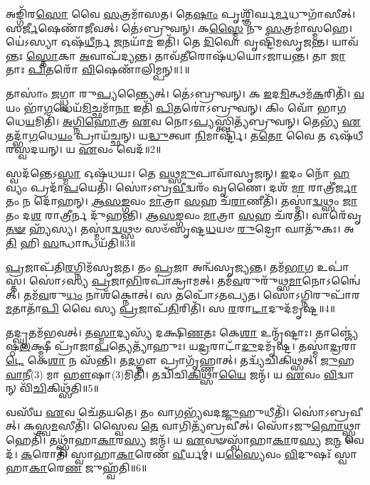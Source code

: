 𑌅𑌙𑍍𑌗𑌿᳴𑌰\-\ul{𑌸𑍋} 𑌵𑍈 \ul{𑌸}\-𑌤𑍍𑌰𑌮𑌾᳴𑌸𑌤।
𑌤𑍇\-\ul{𑌷𑌾𑌂} 𑌪𑍃𑌶𑍍𑌞𑌿᳴𑌰𑍍𑌘\-\ul{𑌰𑍍𑌮}\-𑌧𑍁𑌗𑌾᳴𑌸𑍀𑌤𑍍।
𑌸\-\ul{𑌰𑍍𑌜𑍀}\-𑌷𑍇𑌣𑌾᳴𑌜𑍀𑌵𑌤𑍍।
𑌤𑍇॑𑌽𑌬𑍍𑌰𑍁𑌵𑌨𑍍।
𑌕\-\ul{𑌸𑍍𑌮𑍈} 𑌨𑍁 \ul{𑌸}\-𑌤𑍍𑌰𑌮𑌾॑𑌸𑍍𑌮𑌹𑍇।
𑌯𑍇॑𑌽𑌸𑍍𑌯𑌾 𑌓𑌷᳴\-\ul{𑌧𑍀}\-𑌰𑍍𑌨 \ul{𑌜}\-𑌨𑌯𑌾᳴\-\ul{𑌮} 𑌇𑌤𑌿᳴।
𑌤𑍇 \ul{𑌦𑌿}\-𑌵𑍋 𑌵𑍃𑌷𑍍𑌟𑌿᳴𑌮𑌸𑍃𑌜𑌨𑍍𑌤।
𑌯𑌾𑌵᳴𑌨𑍍𑌤𑌃 \ul{𑌸𑍍𑌤𑍋}\-𑌕𑌾 \ul{𑌅}\-𑌵𑌾𑌪᳴𑌦𑍍𑌯𑌨𑍍𑌤।
𑌤𑌾𑌵᳴\-\ul{𑌤𑍀}\-𑌰𑍋𑌷᳴𑌧𑌯𑍋\-𑌽𑌜𑌾𑌯𑌨𑍍𑌤।
𑌤𑌾 \ul{𑌜𑌾}\-𑌤𑌾𑌃 \ul{𑌪𑌿}\-𑌤𑌰𑍋᳴ \ul{𑌵𑌿}\-𑌷𑍇𑌣𑌾᳴𑌲𑌿𑌮𑍍𑌪𑌨𑍍॥1॥

𑌤𑌾𑌸𑌾𑌂॑ \ul{𑌜}\-𑌗𑍍𑌧𑍍𑌵𑌾 𑌰𑍁\-\ul{𑌪𑍍𑌯}\-𑌨𑍍𑌤𑍍𑌯𑍈𑌤𑍍।
𑌤𑍇॑𑌽𑌬𑍍𑌰𑍁𑌵𑌨𑍍।
𑌕 \ul{𑌇}\-𑌦\-\ul{𑌮𑌿}\-𑌤𑍍𑌥𑌮᳴\-\ul{𑌕}\-𑌰𑌿𑌤𑌿᳴।
\-\ul{𑌵}\-𑌯𑌂 𑌭𑌾᳴\-\ul{𑌗}\-𑌧𑍇𑌯᳴\-\ul{𑌮𑌿}\-𑌚𑍍𑌛𑌮𑌾᳴\-\ul{𑌨𑌾} 𑌇𑌤𑌿᳴ \ul{𑌪𑌿}\-𑌤𑌰𑍋॑\-𑌽𑌬𑍍𑌰𑍁𑌵𑌨𑍍।
𑌕𑌿𑌂 𑌵𑍋᳴ 𑌭𑌾\-\ul{𑌗}\-𑌧𑍇\-\ul{𑌯}\-𑌮𑌿𑌤𑌿᳴।
\-\ul{𑌅}\-\-\ul{𑌗𑍍𑌨𑌿}\-\-\ul{𑌹𑍋}\-𑌤𑍍𑌰 \ul{𑌏}\-𑌵 𑌨𑍋𑌽\-\ul{𑌪𑍍𑌯}\-𑌸𑍍𑌤𑍍𑌵𑌿𑌤𑍍𑌯᳴𑌬𑍍𑌰𑍁𑌵𑌨𑍍।
𑌤𑍇𑌭𑍍𑌯᳴ \ul{𑌏}\-𑌤𑌦𑍍𑌭𑌾᳴\-\ul{𑌗}\-𑌧𑍇\-\ul{𑌯𑌂} 𑌪𑍍𑌰𑌾𑌯᳴𑌚𑍍𑌛𑌨𑍍।
𑌯\-\ul{𑌦𑍍𑌧𑍁}\-𑌤𑍍𑌵𑌾 \ul{𑌨𑌿}\-𑌮𑌾𑌰𑍍𑌷𑍍𑌟𑌿᳴।
𑌤\-\ul{𑌤𑍋} 𑌵𑍈 𑌤 𑌓𑌷᳴𑌧𑍀𑌰𑌸𑍍𑌵𑌦𑌯𑌨𑍍।
𑌯 \ul{𑌏}\-𑌵𑌂 𑌵𑍇𑌦᳴॥2॥

𑌸𑍍𑌵𑌦᳴𑌨𑍍𑌤𑍇\-𑌽\-\ul{𑌸𑍍𑌮𑌾} 𑌓𑌷᳴𑌧𑌯𑌃।
𑌤𑍇 \ul{𑌵}\-𑌥𑍍𑌸\-\ul{𑌮𑍁}\-𑌪𑌾𑌵𑌾᳴𑌸𑍃𑌜𑌨𑍍।
\-\ul{𑌇}\-𑌦𑌂 𑌨𑍋᳴ \ul{𑌹}\-𑌵𑍍𑌯𑌂 𑌪𑍍𑌰𑌦𑌾᳴\-\ul{𑌪}\-𑌯𑍇𑌤𑌿᳴।
𑌸𑍋॑𑌽𑌬𑍍𑌰\-\ul{𑌵𑍀}\-𑌦𑍍𑌵𑌰𑌂᳴ 𑌵𑍃𑌣𑍈।
𑌦𑌶᳴ \ul{𑌮𑌾} 𑌰𑌾𑌤𑍍𑌰𑍀॑\-\ul{𑌰𑍍𑌜𑌾}\-𑌤𑌂 𑌨 𑌦𑍋᳴𑌹𑌨𑍍।
\-\ul{𑌆}\-\-\ul{𑌸}\-\-\ul{𑌙𑍍𑌗}\-𑌵𑌂 \ul{𑌮𑌾}\-𑌤𑍍𑌰𑌾 \ul{𑌸}\-𑌹 𑌚᳴\-\ul{𑌰𑌾}\-𑌣𑍀𑌤𑌿᳴।
𑌤𑌸𑍍𑌮𑌾॑\-\ul{𑌦𑍍𑌵}\-𑌥𑍍𑌸𑌂 \ul{𑌜𑌾}\-𑌤𑌂 𑌦\-\ul{𑌶} 𑌰𑌾\-\ul{𑌤𑍍𑌰𑍀}\-𑌰𑍍𑌨 𑌦𑍁᳴𑌹𑌨𑍍𑌤𑌿।
\-\ul{𑌆}\-\-\ul{𑌸}\-\-\ul{𑌙𑍍𑌗}\-𑌵𑌂 \ul{𑌮𑌾}\-𑌤𑍍𑌰𑌾 \ul{𑌸}\-𑌹 𑌚᳴𑌰𑌤𑌿।
𑌵𑌾𑌰𑍇᳴𑌵𑍃\-\ul{𑌤}\-\-\ul{𑍟} 𑌹𑍍𑌯᳴𑌸𑍍𑌯।
𑌤𑌸𑍍𑌮𑌾॑\-\ul{𑌦𑍍𑌵}\-𑌥𑍍𑌸𑍞 𑌸𑍞᳴𑌸𑍃𑌷𑍍𑌟\-\ul{𑌧}\-𑌯𑍞 \ul{𑌰𑍁}\-𑌦𑍍𑌰𑍋 𑌘𑌾𑌤𑍁᳴𑌕𑌃।
𑌅\-\ul{𑌤𑌿} 𑌹𑌿 \ul{𑌸}\-𑌨𑍍𑌧𑌾𑌨𑍍𑌧𑌯᳴𑌤𑌿॥3॥\anuvakamend[\-\ul{𑌅}\-\-\ul{𑌲𑌿}\-\-\ul{𑌮𑍍𑌪}\-𑌨𑍍𑌵𑍇\-\ul{𑌦} 𑌘𑌾𑌤𑍁᳴\-\ul{𑌕} 𑌏𑌕𑌂᳴ 𑌚]

\-\ul{𑌪𑍍𑌰}\-𑌜𑌾𑌪᳴𑌤𑌿\-\ul{𑌰}\-𑌗𑍍𑌨𑌿𑌮᳴\-𑌸𑍃𑌜𑌤।
𑌤𑌂 \ul{𑌪𑍍𑌰}\-𑌜𑌾 𑌅𑌨𑍍𑌵᳴𑌸𑍃𑌜𑍍𑌯𑌨𑍍𑌤।
𑌤𑌮᳴\-\ul{𑌭𑌾}\-𑌗 𑌉𑌪𑌾॑𑌸𑍍𑌤।
𑌸𑍋॑𑌽𑌸𑍍𑌯 \ul{𑌪𑍍𑌰}\-𑌜𑌾\-\ul{𑌭𑌿}\-𑌰𑌪𑌾॑𑌕𑍍𑌰𑌾𑌮𑌤𑍍।
𑌤𑌮᳴\-\ul{𑌵}\-𑌰𑍁𑌰𑍁᳴𑌥𑍍𑌸\-\ul{𑌮𑌾}\-𑌨𑍋\-𑌽𑌨𑍍𑌵𑍈॑𑌤𑍍।
𑌤𑌮᳴\-\ul{𑌵}\-𑌰𑍁\-\ul{𑌧𑌂} 𑌨𑌾𑌶᳴𑌕𑍍𑌨𑍋𑌤𑍍।
𑌸 𑌤𑌪𑍋᳴\-𑌽𑌤𑌪𑍍𑌯𑌤।
𑌸𑍋॑𑌽𑌗𑍍𑌨𑌿𑌰𑍁𑌪𑌾᳴𑌰\-\ul{𑌮}\-𑌤𑌾𑌤𑌾᳴\-\ul{𑌪𑌿} 𑌵𑍈 𑌸𑍍𑌯 \ul{𑌪𑍍𑌰}\-𑌜𑌾𑌪᳴\-\ul{𑌤𑌿}\-𑌰𑌿𑌤𑌿᳴।
𑌸 \ul{𑌰}\-𑌰𑌾\-\ul{𑌟𑌾}\-𑌦𑍁𑌦᳴𑌮𑍃𑌷𑍍𑌟॥4॥

𑌤𑌦𑍍\mbox{}\-\ul{𑌘𑍃}\-𑌤𑌮᳴𑌭𑌵𑌤𑍍।
𑌤\-\ul{𑌸𑍍𑌮𑌾}\-𑌦𑍍𑌯𑌸𑍍𑌯᳴ 𑌦𑌕𑍍𑌷𑌿\-\ul{𑌣}\-𑌤𑌃 𑌕𑍇\-\ul{𑌶𑌾} 𑌉𑌨𑍍𑌮𑍃᳴𑌷𑍍𑌟𑌾𑌃।
𑌤𑌾𑌞𑍍𑌜𑍍𑌯𑍇॑𑌷𑍍𑌠\-\ul{𑌲}\-𑌕𑍍𑌷𑍍𑌮𑍀 𑌪𑍍𑌰𑌾᳴𑌜𑌾\-\ul{𑌪}\-𑌤𑍍𑌯𑍇𑌤𑍍𑌯𑌾᳴𑌹𑍁𑌃।
𑌯\-\ul{𑌦𑍍𑌰}\-𑌰𑌾𑌟𑌾᳴\-\ul{𑌦𑍁}\-𑌦𑌮𑍃᳴𑌷𑍍𑌟।
𑌤𑌸𑍍𑌮𑌾॑\-\ul{𑌦𑍍𑌰}\-𑌰𑌾\-\ul{𑌟𑍇} 𑌕𑍇\-\ul{𑌶𑌾} 𑌨 𑌸᳴𑌨𑍍𑌤𑌿।
𑌤\-\ul{𑌦}\-𑌗𑍍𑌨𑍗 𑌪𑍍𑌰𑌾𑌗𑍃᳴𑌹𑍍𑌣𑌾𑌤𑍍।
𑌤𑌦𑍍𑌵𑍍𑌯᳴𑌚𑌿𑌕𑌿𑌥𑍍𑌸𑌤𑍍।
\-\ul{𑌜𑍁}\-𑌹\-\ul{𑌵𑌾}\-𑌨𑍀(3) 𑌮𑌾 \ul{𑌹𑍗}\-𑌷𑌾(3)𑌮𑌿𑌤𑌿᳴।
𑌤𑌦𑍍𑌵𑌿᳴𑌚𑌿\-\ul{𑌕𑌿}\-𑌥𑍍𑌸𑌾\-\ul{𑌯𑍈} 𑌜𑌨𑍍𑌮᳴।
𑌯 \ul{𑌏}\-𑌵𑌂 \ul{𑌵𑌿}\-𑌦𑍍𑌵𑌾𑌨𑍍 𑌵𑌿᳴\-\ul{𑌚𑌿}\-𑌕𑌿𑌥𑍍𑌸᳴𑌤𑌿॥5॥

𑌵𑌸𑍀᳴𑌯 \ul{𑌏}\-𑌵 𑌚𑍇᳴𑌤𑌯𑌤𑍇।
𑌤𑌂 𑌵𑌾\-\ul{𑌗}\-𑌭𑍍𑌯᳴𑌵𑌦\-\ul{𑌜𑍍𑌜𑍁}\-𑌹𑍁𑌧𑍀𑌤𑌿᳴।
𑌸𑍋॑𑌽𑌬𑍍𑌰𑌵𑍀𑌤𑍍।
𑌕𑌸𑍍𑌤𑍍𑌵\-\ul{𑌮}\-𑌸𑍀𑌤𑌿᳴।
𑌸𑍍𑌵𑍈𑌵 \ul{𑌤𑍇} 𑌵𑌾𑌗𑌿𑌤𑍍𑌯᳴𑌬𑍍𑌰𑌵𑍀𑌤𑍍।
𑌸𑍋᳴𑌽𑌜𑍁\-\ul{𑌹𑍋}\-𑌥𑍍𑌸𑍍𑌵𑌾𑌹𑍇𑌤𑌿᳴।
𑌤𑌥𑍍𑌸𑍍𑌵𑌾᳴𑌹𑌾\-\ul{𑌕𑌾}\-𑌰\-\ul{𑌸𑍍𑌯} 𑌜𑌨𑍍𑌮᳴।
𑌯 \ul{𑌏}\-𑌵𑍟𑌸𑍍𑌵𑌾᳴𑌹𑌾\-\ul{𑌕𑌾}\-𑌰\-\ul{𑌸𑍍𑌯} 𑌜\-\ul{𑌨𑍍𑌮} 𑌵𑍇𑌦᳴।
\-\ul{𑌕}\-𑌰𑍋𑌤𑌿᳴ 𑌸𑍍𑌵𑌾𑌹𑌾\-\ul{𑌕𑌾}\-𑌰𑍇𑌣᳴ \ul{𑌵𑍀}\-𑌰𑍍𑌯𑌮𑍍॑।
𑌯\-\ul{𑌸𑍍𑌯𑍈}\-𑌵𑌂 \ul{𑌵𑌿}\-𑌦𑍁𑌷𑌃᳴ 𑌸𑍍𑌵𑌾𑌹𑌾\-\ul{𑌕𑌾}\-𑌰𑍇\-\ul{𑌣} 𑌜𑍁𑌹𑍍𑌵᳴𑌤𑌿॥6॥

